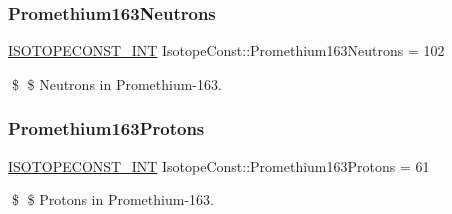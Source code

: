 \subsubsection{\texorpdfstring{Promethium163\+Neutrons}{Promethium163Neutrons}}
{\footnotesize\ttfamily \mbox{\hyperlink{group___isotope_const-_macros_ga5f18360b3e99483a35c32d789e62621c}{I\+S\+O\+T\+O\+P\+E\+C\+O\+N\+S\+T\+\_\+\+I\+NT}} Isotope\+Const\+::\+Promethium163\+Neutrons = 102}

\$ \$ Neutrons in Promethium-\/163. \mbox{\label{group___isotope_const-_promethium-_pm163_ga69016f552b3edbe34138cba076a58fd5}} 
\subsubsection{\texorpdfstring{Promethium163\+Protons}{Promethium163Protons}}
{\footnotesize\ttfamily \mbox{\hyperlink{group___isotope_const-_macros_ga5f18360b3e99483a35c32d789e62621c}{I\+S\+O\+T\+O\+P\+E\+C\+O\+N\+S\+T\+\_\+\+I\+NT}} Isotope\+Const\+::\+Promethium163\+Protons = 61}

\$ \$ Protons in Promethium-\/163. 
